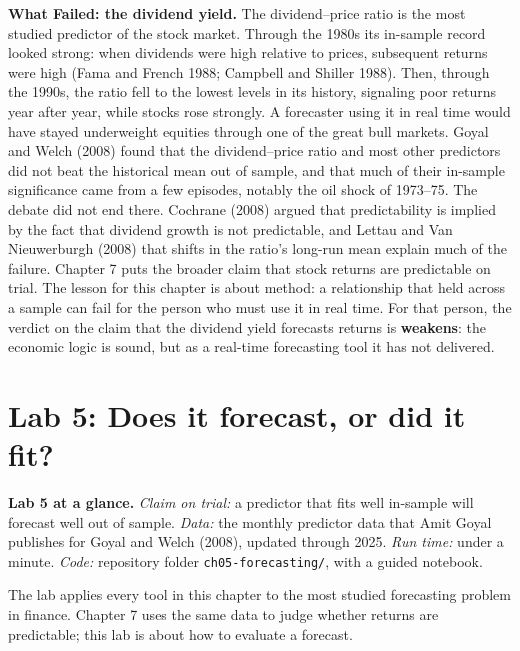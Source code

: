 \begin{callout}
\textbf{What Failed: the dividend yield.} The dividend--price ratio is the most studied predictor of the stock market. Through the 1980s its in-sample record looked strong: when dividends were high relative to prices, subsequent returns were high (Fama and French 1988; Campbell and Shiller 1988). Then, through the 1990s, the ratio fell to the lowest levels in its history, signaling poor returns year after year, while stocks rose strongly. A forecaster using it in real time would have stayed underweight equities through one of the great bull markets. Goyal and Welch (2008) found that the dividend--price ratio and most other predictors did not beat the historical mean out of sample, and that much of their in-sample significance came from a few episodes, notably the oil shock of 1973--75. The debate did not end there. Cochrane (2008) argued that predictability is implied by the fact that dividend growth is not predictable, and Lettau and Van Nieuwerburgh (2008) that shifts in the ratio's long-run mean explain much of the failure. Chapter 7 puts the broader claim that stock returns are predictable on trial. The lesson for this chapter is about method: a relationship that held across a sample can fail for the person who must use it in real time. For that person, the verdict on the claim that the dividend yield forecasts returns is \textbf{weakens}: the economic logic is sound, but as a real-time forecasting tool it has not delivered.
\end{callout}

\section{Lab 5: Does it forecast, or did it fit?}
\label{sec:05-lab}

\begin{callout}
\textbf{Lab 5 at a glance.} \emph{Claim on trial:} a predictor that fits well in-sample will forecast well out of sample. \emph{Data:} the monthly predictor data that Amit Goyal publishes for Goyal and Welch (2008), updated through 2025. \emph{Run time:} under a minute. \emph{Code:} repository folder \texttt{ch05-forecasting/}, with a guided notebook.
\end{callout}

The lab applies every tool in this chapter to the most studied forecasting problem in finance. Chapter 7 uses the same data to judge whether returns are predictable; this lab is about how to evaluate a forecast.

